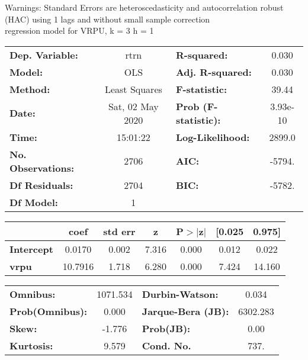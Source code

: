 Warnings: \newline
 [1] Standard Errors are heteroscedasticity and autocorrelation robust (HAC) using 1 lags and without small sample correction\\ 

regression model for VRPU, k = 3 h = 1\begin{center}
\begin{tabular}{lclc}
\toprule
\textbf{Dep. Variable:}    &       rtrn       & \textbf{  R-squared:         } &     0.030   \\
\textbf{Model:}            &       OLS        & \textbf{  Adj. R-squared:    } &     0.030   \\
\textbf{Method:}           &  Least Squares   & \textbf{  F-statistic:       } &     39.44   \\
\textbf{Date:}             & Sat, 02 May 2020 & \textbf{  Prob (F-statistic):} &  3.93e-10   \\
\textbf{Time:}             &     15:01:22     & \textbf{  Log-Likelihood:    } &    2899.0   \\
\textbf{No. Observations:} &        2706      & \textbf{  AIC:               } &    -5794.   \\
\textbf{Df Residuals:}     &        2704      & \textbf{  BIC:               } &    -5782.   \\
\textbf{Df Model:}         &           1      & \textbf{                     } &             \\
\bottomrule
\end{tabular}
\begin{tabular}{lcccccc}
                   & \textbf{coef} & \textbf{std err} & \textbf{z} & \textbf{P$> |$z$|$} & \textbf{[0.025} & \textbf{0.975]}  \\
\midrule
\textbf{Intercept} &       0.0170  &        0.002     &     7.316  &         0.000        &        0.012    &        0.022     \\
\textbf{vrpu}      &      10.7916  &        1.718     &     6.280  &         0.000        &        7.424    &       14.160     \\
\bottomrule
\end{tabular}
\begin{tabular}{lclc}
\textbf{Omnibus:}       & 1071.534 & \textbf{  Durbin-Watson:     } &    0.034  \\
\textbf{Prob(Omnibus):} &   0.000  & \textbf{  Jarque-Bera (JB):  } & 6302.283  \\
\textbf{Skew:}          &  -1.776  & \textbf{  Prob(JB):          } &     0.00  \\
\textbf{Kurtosis:}      &   9.579  & \textbf{  Cond. No.          } &     737.  \\
\bottomrule
\end{tabular}
\end{center}

